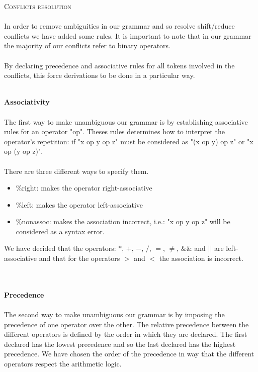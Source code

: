 \documentclass[11pt]{report}
\begin{document}
\newpage
{}
{}
\vspace*{3pt}
\vspace*{10pt}
\vspace*{10pt}
{} 
\tabto{1cm} {\Large \textsc{Conflicts resolution}}
\\ \\ 
\tabto{1cm} In order to remove ambiguities in our grammar and so resolve shift/reduce conflicts we have added some rules. It is important to note that in our grammar the majority of our conflicts refer to binary operators.  \\ \\
By declaring precedence and associative rules for all tokens involved in the conflicts, this force derivations to be done in a particular way.
\\ \\ 
{} 
\tabto{2cm} \textbf{Associativity}
\\ \\
\tabto{1cm} The first way to make unambiguous our grammar is by establishing associative rules for an operator "op". Theses rules determines how to interpret the operator's repetition: if "x op y op z" must be considered as "(x op y) op z" or "x op (y op z)". \\ \\
There are three different ways to specify them. 
\begin{itemize}
\item \%right:  makes the operator right-associative
\item \%left: makes the operator left-associative
\item \%nonassoc: makes the association incorrect, i.e.: "x op y op z" will be considered as a syntax error.
\end{itemize}
We have decided that the operators: $*$, $+$, $-$, $/$, $=$, $\ne$, $\&\&$ and $||$ are left-associative and that for the operators $>$ and $<$ the association is incorrect.
\\ \\ \\
{} 
\tabto{2cm} \textbf{Precedence}
\\ \\
\tabto{1cm} The second way to make unambiguous our grammar is by imposing the precedence of one operator over the other. The relative precedence between the different operators is defined by the order in which they are declared. The first declared has the lowest precedence and so the last declared has the highest precedence. We have chosen the order of the precedence in way that the different operators respect the arithmetic logic.
\end{document}
